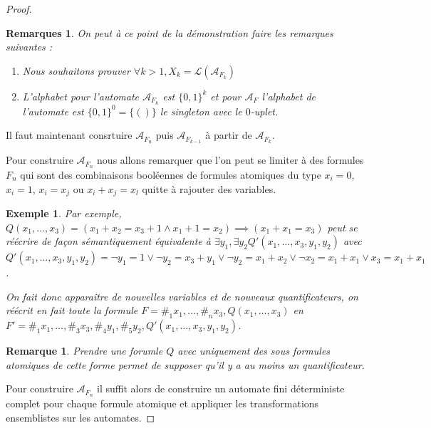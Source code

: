 \documentclass[12pt]{article}
\theoremstyle{break}
\newtheorem*{remark*}{Remarque}
\newtheorem*{remarks*}{Remarques}
\newtheorem*{example*}{Exemple}
\begin{document}
\begin{proof}
  \begin{remarks*}
    On peut à ce point de la démonstration faire les remarques suivantes :
    \begin{enumerate}
    \item Nous souhaitons prouver $\forall k>1, X_k = \mathcal{L}(\mathcal{A}_{F_k})$
    \item L'alphabet pour l'automate $\mathcal{A}_{F_k}$ est $\{0, 1\}^k$ et pour $\mathcal{A}_F$ l'alphabet de l'automate est $\{0, 1\}^0 = \{()\}$ le singleton avec le $0$-uplet.
    \end{enumerate}
  \end{remarks*}

  Il faut maintenant consrtuire $\mathcal{A}_{F_n}$ puis $\mathcal{A}_{F_{k-1}}$ à partir de $\mathcal{A}_{F_k}$.

  Pour construire $\mathcal{A}_{F_n}$ nous allons remarquer que l'on peut se limiter à des formules $F_n$ qui sont des combinaisons booléennes de formules atomiques du type $x_i = 0$, $x_i = 1$, $x_i = x_j$ ou $x_i+x_j=x_l$ quitte à rajouter des variables.

  \begin{example*}
    Par exemple, $Q(x_1, \ldots, x_3) = (x_1 + x_2 = x_3 + 1 \land x_1 + 1 = x_2) \implies (x_1 + x_1 = x_3)$ peut se réécrire de façon sémantiquement équivalente à $\exists y_1, \exists y_2 Q'(x_1, \ldots, x_3, y_1, y_2)$ avec $Q'(x_1, \ldots, x_3, y_1, y_2) = \lnot y_1 = 1 \lor \lnot y_2 = x_3 + y_1 \lor \lnot y_2 = x_1 + x_2 \lor \lnot x_2 = x_1 + x_1 \lor x_3 = x_1 + x_1$.

    \noindent
    On fait donc appara\^itre de nouvelles variables et de nouveaux quantificateurs, on réécrit en fait toute la formule $F=\#_1x_1, \ldots, \#_nx_3, Q(x_1, \ldots, x_3)$ en $F'=\#_1x_1, \ldots, \#_3x_3, \#_4y_1, \#_5y_2, Q'(x_1, \ldots, x_3, y_1, y_2)$.
  \end{example*}

  \begin{remark*}
    Prendre une forumle $Q$ avec uniquement des sous formules atomiques de cette forme permet de supposer qu'il y a au moins un quantificateur.
  \end{remark*}


  Pour construire $\mathcal{A}_{F_n}$ il suffit alors de construire un automate fini déterministe complet pour chaque formule atomique et appliquer les transformations ensemblistes sur les automates.


\end{proof}
\end{document}
